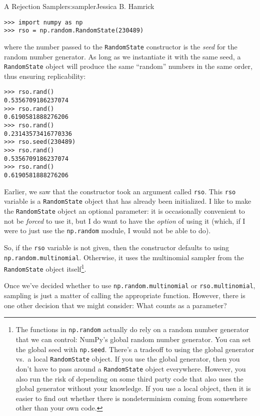 \begin{aosachapter}{A Rejection Sampler}{s:sampler}{Jessica B. Hamrick}
\begin{verbatim}
>>> import numpy as np
>>> rso = np.random.RandomState(230489)
\end{verbatim}

where the number passed to the \texttt{RandomState} constructor is the
\emph{seed} for the random number generator. As long as we instantiate
it with the same seed, a \texttt{RandomState} object will produce the
same ``random'' numbers in the same order, thus ensuring replicability:

\begin{verbatim}
>>> rso.rand()
0.5356709186237074
>>> rso.rand()
0.6190581888276206
>>> rso.rand()
0.23143573416770336
>>> rso.seed(230489)
>>> rso.rand()
0.5356709186237074
>>> rso.rand()
0.6190581888276206
\end{verbatim}

Earlier, we saw that the constructor took an argument called
\texttt{rso}. This \texttt{rso} variable is a \texttt{RandomState}
object that has already been initialized. I like to make the
\texttt{RandomState} object an optional parameter: it is occasionally
convenient to not be \emph{forced} to use it, but I do want to have the
\emph{option} of using it (which, if I were to just use the
\texttt{np.random} module, I would not be able to do).

So, if the \texttt{rso} variable is not given, then the constructor
defaults to using \texttt{np.random.multinomial}. Otherwise, it uses the
multinomial sampler from the \texttt{RandomState} object
itself\footnote{The functions in \texttt{np.random} actually do rely on
  a random number generator that we can control: NumPy's global random
  number generator. You can set the global seed with \texttt{np.seed}.
  There's a tradeoff to using the global generator vs.~a local
  \texttt{RandomState} object. If you use the global generator, then you
  don't have to pass around a \texttt{RandomState} object everywhere.
  However, you also run the risk of depending on some third party code
  that also uses the global generator without your knowledge. If you use
  a local object, then it is easier to find out whether there is
  nondeterminism coming from somewhere other than your own code.}.

\label{whats-a-parameter}

Once we've decided whether to use \texttt{np.random.multinomial} or
\texttt{rso.multinomial}, sampling is just a matter of calling the
appropriate function. However, there is one other decision that we might
consider: What counts as a parameter?


\end{aosachapter}
